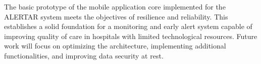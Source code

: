 The basic prototype of the mobile application core implemented for the ALERTAR system meets the objectives of resilience and reliability. This establishes a solid foundation for a monitoring and early alert system capable of improving quality of care in hospitals with limited technological resources. Future work will focus on optimizing the architecture, implementing additional functionalities, and improving data security at rest.

\vfill
\pagebreak
